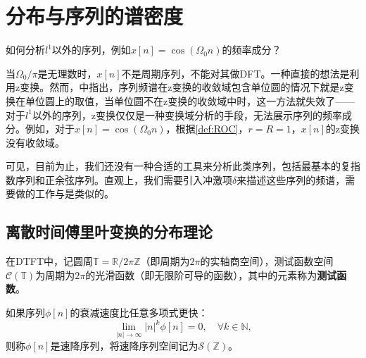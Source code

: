 \section{分布与序列的谱密度}\label{sec:Discrete_Distribution}

如何分析$l^1$以外的序列，例如$x[n]=\cos(\Omega_0 n)$的频率成分？

当$\Omega_0/\pi$是无理数时，$x[n]$不是周期序列，不能对其做DFT。一种直接的想法是利用z变换。然而，中指出，序列频谱在z变换的收敛域包含单位圆的情况下就是z变换在单位圆上的取值，当单位圆不在z变换的收敛域中时，这一方法就失效了——对于$l^1$以外的序列，z变换仅仅是一种变换域分析的手段，无法展示序列的频率成分。例如，对于$x[n]=\cos(\Omega_0 n)$，根据\cref{def:ROC}，$r=R=1$，$x[n]$的z变换没有收敛域。

可见，目前为止，我们还没有一种合适的工具来分析此类序列，包括最基本的复指数序列和正余弦序列。直观上，我们需要引入冲激项$\delta$来描述这些序列的频谱，需要做的工作与是类似的。

\subsection{离散时间傅里叶变换的分布理论}\label{sub:DTFT_distribution}

\begin{definition}[测试函数]
    在DTFT中，记圆周$\mathbb{T}=\mathbb{R}/2\pi\mathbb{Z}$（即周期为$2\pi$的实轴商空间），测试函数空间$\mathcal{C}(\mathbb{T})$为周期为$2\pi$的光滑函数（即无限阶可导的函数），其中的元素称为\textbf{测试函数}。
\end{definition}

\begin{definition}[速降序列]
    如果序列$\phi[n]$的衰减速度比任意多项式更快：
    \begin{equation}
        \lim_{|n|\to\infty}|n|^k\phi[n]=0,\quad \forall k\in\mathbb{N},
    \end{equation}
    则称$\phi[n]$是速降序列，将速降序列空间记为$\mathcal{S}(\mathbb{Z})$。
\end{definition}

